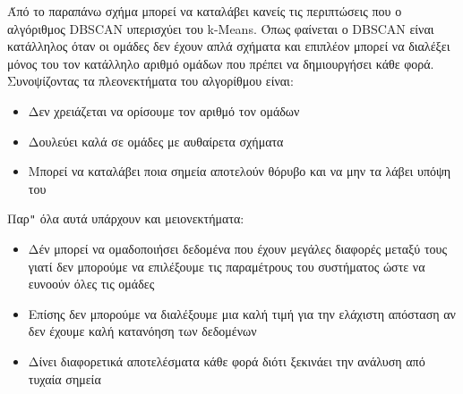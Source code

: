 Άπό το παραπάνω σχήμα μπορεί να καταλάβει κανείς τις περιπτώσεις που ο αλγόριθμος \textlatin{DBSCAN} υπερισχύει του \textlatin{k-Means}. Όπως φαίνεται ο \textlatin{DBSCAN} είναι κατάλληλος όταν
οι ομάδες δεν έχουν απλά σχήματα και επιπλέον μπορεί να διαλέξει μόνος του τον κατάλληλο αριθμό ομάδων που πρέπει να δημιουργήσει κάθε φορά. Συνοψίζοντας τα πλεονεκτήματα του αλγορίθμου
είναι\cite{dbscanadv}:
\begin{itemize}
    \item Δεν χρειάζεται να ορίσουμε τον αριθμό τον ομάδων
    \item Δουλεύει καλά σε ομάδες με αυθαίρετα σχήματα
    \item Μπορεί να καταλάβει ποια σημεία αποτελούν θόρυβο και να  μην τα λάβει υπόψη του
\end{itemize}
Παρ\texttt{"} όλα αυτά υπάρχουν και μειονεκτήματα:
\begin{itemize}
    \item Δέν μπορεί να ομαδοποιήσει δεδομένα που έχουν μεγάλες διαφορές μεταξύ τους γιατί δεν μπορούμε να επιλέξουμε τις παραμέτρους του συστήματος ώστε να ευνοούν όλες τις ομάδες
    \item Επίσης δεν μπορούμε να διαλέξουμε μια καλή τιμή για την ελάχιστη απόσταση αν δεν έχουμε καλή κατανόηση των δεδομένων
    \item Δίνει διαφορετικά αποτελέσματα κάθε φορά διότι ξεκινάει την ανάλυση από τυχαία σημεία
\end{itemize}
